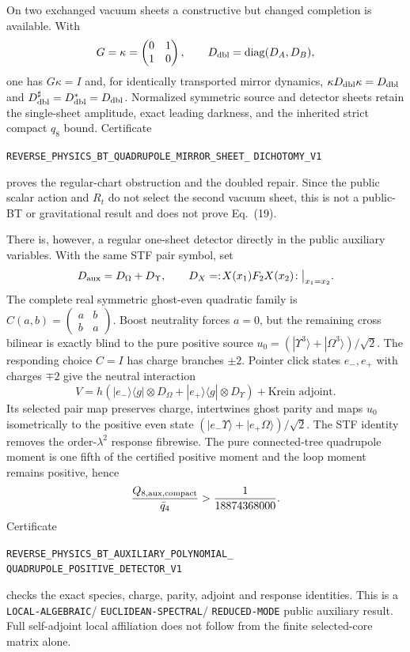 \documentclass[11pt]{article}
\theoremstyle{definition}
\theoremstyle{remark}
\begin{document}
On two exchanged vacuum sheets a constructive but changed completion is
available.  With
\[
 G=\kappa=\begin{pmatrix}0&1\\1&0\end{pmatrix},\qquad
 D_{\rm dbl}=\operatorname{diag}(D_A,D_B),
\]
one has $G\kappa=I$ and, for identically transported mirror dynamics,
$\kappa D_{\rm dbl}\kappa=D_{\rm dbl}$ and
$D_{\rm dbl}^{\sharp}=D_{\rm dbl}^{*}=D_{\rm dbl}$.  Normalized symmetric
source and detector sheets retain the single-sheet amplitude, exact leading
darkness, and the inherited strict compact $q_8$ bound.  Certificate
\par\noindent
\texttt{REVERSE\_PHYSICS\_BT\_QUADRUPOLE\_MIRROR\_SHEET\_}
\allowbreak\texttt{DICHOTOMY\_V1}
\par\noindent
proves the regular-chart obstruction and the doubled repair.  Since the
public scalar action and $R_t$ do not select the second vacuum sheet, this is
not a public-BT or gravitational result and does not prove Eq.~(19).

There is, however, a regular one-sheet detector directly in the public
auxiliary variables.  With the same STF pair symbol, set
\[
 D_{\rm aux}=D_\Omega+D_\Upsilon,
 \qquad D_X=:\!X(x_1)F_2X(x_2)\!:\big|_{x_1=x_2}.
\]
The complete real symmetric ghost-even quadratic family is
$C(a,b)=\left(\begin{smallmatrix}a&b\\b&a\end{smallmatrix}\right)$.
Boost neutrality forces $a=0$, but the remaining cross bilinear is exactly
blind to the pure positive source
$u_0=(|\Upsilon^3\rangle+|\Omega^3\rangle)/\sqrt2$.  The responding choice
$C=I$ has charge branches $\pm2$.  Pointer click states $e_-,e_+$ with
charges $\mp2$ give the neutral interaction
\[
 V=h\left(|e_-\rangle\langle g|\otimes D_\Omega
          +|e_+\rangle\langle g|\otimes D_\Upsilon\right)
   +\text{Krein adjoint}.
\]
Its selected pair map preserves charge, intertwines ghost parity and maps
$u_0$ isometrically to the positive even state
$(|e_-\Upsilon\rangle+|e_+\Omega\rangle)/\sqrt2$.  The STF identity removes
the order-$\lambda^2$ response fibrewise.  The pure connected-tree
quadrupole moment is one fifth of the certified positive moment and the loop
moment remains positive, hence
\[
 \frac{Q_{8,{\rm aux},\rm compact}}{\bar q_4}
 >\frac{1}{18874368000}.
\]
Certificate
\par\noindent
\texttt{REVERSE\_PHYSICS\_BT\_AUXILIARY\_POLYNOMIAL\_}
\allowbreak\texttt{QUADRUPOLE\_POSITIVE\_DETECTOR\_V1}
\par\noindent
checks the exact species, charge, parity, adjoint and response identities.
This is a
\texttt{LOCAL-}\allowbreak\texttt{ALGEBRAIC}/
\texttt{EUCLIDEAN-}\allowbreak\texttt{SPECTRAL}/
\texttt{REDUCED-}\allowbreak\texttt{MODE} public auxiliary result.  Full
self-adjoint local affiliation does not follow from the finite selected-core
matrix alone.
\end{document}
